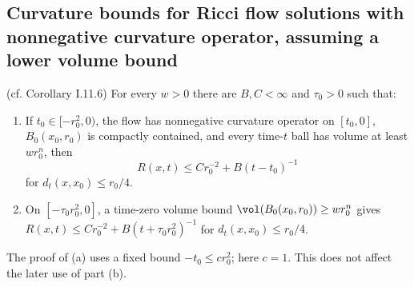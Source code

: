 \subsection{Curvature bounds for Ricci flow solutions with nonnegative curvature operator, assuming a lower volume bound}
\begin{corollary}
\label{cor:kl-curvature-bounds-ricci-flow-solutions-nonnegative-curvature-operator-ass-existence-curvature-operators}

(cf. Corollary I.11.6) \label{corI.11.6}
For every $w>0$ there are $B,C<\infty$ and $\tau_0>0$ such that:
\begin{enumerate}
\item If $t_0\in[-r_0^2,0)$, the flow has nonnegative curvature operator on
$[t_0,0]$, $B_0(x_0,r_0)$ is compactly contained, and every time-$t$ ball
has volume at least $wr_0^n$, then
\begin{equation}\label{Rbound3}
R(x,t)\leq Cr_0^{-2}+B(t-t_0)^{-1}
\end{equation}
for $d_t(x,x_0)\leq r_0/4$.
\item On $[-\tau_0r_0^2,0]$, a time-zero volume bound
$\vol(B_0(x_0,r_0))\geq wr_0^n$ gives
$R(x,t)\leq Cr_0^{-2}+B(t+\tau_0r_0^2)^{-1}$ for $d_t(x,x_0)\leq r_0/4$.
\end{enumerate}
\end{corollary}
\begin{remark}
\label{rem:kl-curvature-bounds-ricci-flow-solutions-nonnegative-curvature-operator-ass-structural-remark-curvature-operators}


The proof of (a) uses a fixed bound $-t_0\leq cr_0^2$; here $c=1$.
This does not affect the later use of part (b).
\end{remark}
